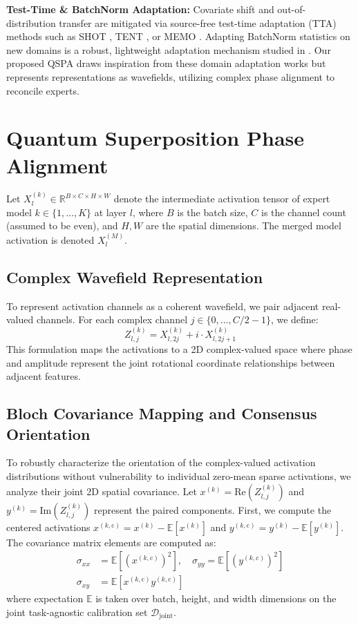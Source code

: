 \documentclass{article}
\begin{document}
\textbf{Test-Time \& BatchNorm Adaptation:} Covariate shift and out-of-distribution transfer are mitigated via source-free test-time adaptation (TTA) methods such as SHOT \cite{liang2020shot}, TENT \cite{wang2020tent}, or MEMO \cite{zhang2021memo}. Adapting BatchNorm statistics on new domains is a robust, lightweight adaptation mechanism studied in \cite{schneider2020improving, nado2020evaluating}. Our proposed QSPA draws inspiration from these domain adaptation works but represents representations as wavefields, utilizing complex phase alignment to reconcile experts.

\section{Quantum Superposition Phase Alignment}
\label{submission:method}
Let $X^{(k)}_l \in \mathbb{R}^{B \times C \times H \times W}$ denote the intermediate activation tensor of expert model $k \in \{1, \ldots, K\}$ at layer $l$, where $B$ is the batch size, $C$ is the channel count (assumed to be even), and $H, W$ are the spatial dimensions. The merged model activation is denoted $X^{(M)}_l$.

\subsection{Complex Wavefield Representation}
To represent activation channels as a coherent wavefield, we pair adjacent real-valued channels. For each complex channel $j \in \{0, \ldots, C/2 - 1\}$, we define:
\begin{equation}
    Z^{(k)}_{l, j} = X^{(k)}_{l, 2j} + i \cdot X^{(k)}_{l, 2j+1}
\end{equation}
This formulation maps the activations to a 2D complex-valued space where phase and amplitude represent the joint rotational coordinate relationships between adjacent features.

\subsection{Bloch Covariance Mapping and Consensus Orientation}
To robustly characterize the orientation of the complex-valued activation distributions without vulnerability to individual zero-mean sparse activations, we analyze their joint 2D spatial covariance. Let $x^{(k)} = \text{Re}(Z^{(k)}_{l, j})$ and $y^{(k)} = \text{Im}(Z^{(k)}_{l, j})$ represent the paired components. First, we compute the centered activations $x^{(k, \text{c})} = x^{(k)} - \mathbb{E}[x^{(k)}]$ and $y^{(k, \text{c})} = y^{(k)} - \mathbb{E}[y^{(k)}]$. The covariance matrix elements are computed as:
\begin{align}
    \sigma_{xx} &= \mathbb{E}\left[(x^{(k, \text{c})})^2\right], \quad \sigma_{yy} = \mathbb{E}\left[(y^{(k, \text{c})})^2\right] \\
    \sigma_{xy} &= \mathbb{E}\left[x^{(k, \text{c})} y^{(k, \text{c})}\right]
\end{align}
where expectation $\mathbb{E}$ is taken over batch, height, and width dimensions on the joint task-agnostic calibration set $\mathcal{D}_{\text{joint}}$.
\end{document}
